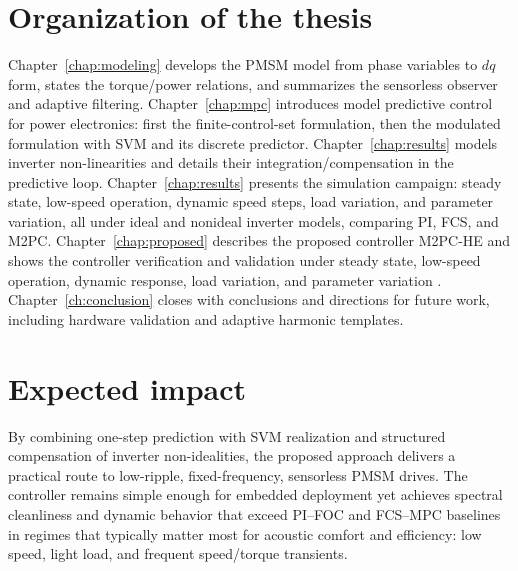 \section{Organization of the thesis}
Chapter~\ref{chap:modeling} develops the PMSM model from phase variables to $dq$ form, states the torque/power relations, and summarizes the sensorless observer and adaptive filtering. Chapter~\ref{chap:mpc} introduces model predictive control for power electronics: first the finite-control-set formulation, then the modulated formulation with SVM and its discrete predictor. Chapter~\ref{chap:results} models inverter non-linearities and details their integration/compensation in the predictive loop. Chapter~\ref{chap:results} presents the simulation campaign: steady state, low-speed operation, dynamic speed steps, load variation, and parameter variation, all under ideal and non\-ideal inverter models, comparing PI, FCS, and M2PC. Chapter~\ref{chap:proposed} describes the proposed controller M2PC-HE and shows the controller verification and validation under steady state, low-speed operation, dynamic response, load variation, and parameter variation . Chapter~\ref{ch:conclusion} closes with conclusions and directions for future work, including hardware validation and adaptive harmonic templates.

\section{Expected impact}
By combining one-step prediction with SVM realization and structured compensation of inverter non-idealities, the proposed approach delivers a practical route to low-ripple, fixed-frequency, sensorless PMSM drives. The controller remains simple enough for embedded deployment yet achieves spectral cleanliness and dynamic behavior that exceed PI–FOC and FCS–MPC baselines in regimes that typically matter most for acoustic comfort and efficiency: low speed, light load, and frequent speed/torque transients.

